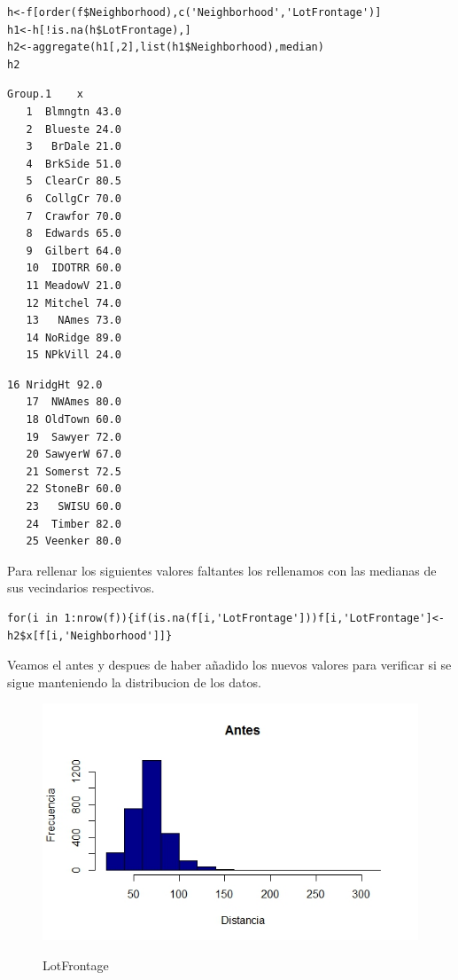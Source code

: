 \documentclass{report}
\begin{document}
\begin{itemize}
\begin{itemize}
\begin{itemize}
\begin{lstlisting}[frame=single]
h<-f[order(f$Neighborhood),c('Neighborhood','LotFrontage')]
h1<-h[!is.na(h$LotFrontage),]
h2<-aggregate(h1[,2],list(h1$Neighborhood),median)
h2
\end{lstlisting}

\begin{lstlisting}[frame=single]
     Group.1    x
   1  Blmngtn 43.0
   2  Blueste 24.0
   3   BrDale 21.0
   4  BrkSide 51.0
   5  ClearCr 80.5
   6  CollgCr 70.0
   7  Crawfor 70.0
   8  Edwards 65.0
   9  Gilbert 64.0
   10  IDOTRR 60.0
   11 MeadowV 21.0
   12 Mitchel 74.0
   13   NAmes 73.0
   14 NoRidge 89.0
   15 NPkVill 24.0
\end{lstlisting}   
\begin{lstlisting}[frame=single]
   16 NridgHt 92.0
   17  NWAmes 80.0
   18 OldTown 60.0
   19  Sawyer 72.0
   20 SawyerW 67.0
   21 Somerst 72.5
   22 StoneBr 60.0
   23   SWISU 60.0
   24  Timber 82.0
   25 Veenker 80.0
\end{lstlisting}
\vspace{2mm}

Para rellenar los siguientes valores faltantes los rellenamos con las medianas de sus vecindarios respectivos. 

\begin{lstlisting}[frame=single]
for(i in 1:nrow(f)){if(is.na(f[i,'LotFrontage']))f[i,'LotFrontage']<-h2$x[f[i,'Neighborhood']]}
\end{lstlisting}
\vspace{2mm}

Veamos el antes y despues de haber añadido los nuevos valores para verificar si se sigue manteniendo la distribucion de los datos.\\

\begin{figure}[h]
	\centering
	\includegraphics[scale=0.75]{Distancia1.JPEG}
	\label{p1}
	\caption{LotFrontage}
\end{figure}


\end{itemize}
\end{itemize}
\end{itemize}
\end{document}
